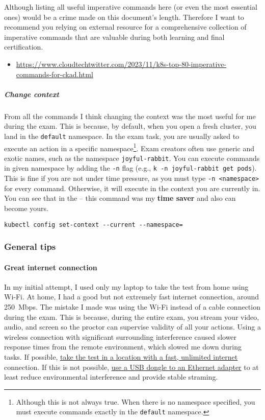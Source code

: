 Although listing all useful imperative commands here (or even the most essential ones) would be a crime made on this document's length. Therefore I want to recommend you relying on external resource for a comprehensive collection of imperative commands that are valuable during both learning and final certification.

\begin{itemize}
	\item \url{https://www.cloudtechtwitter.com/2023/11/k8s-top-80-imperative-commands-for-ckad.html}
\end{itemize}

\subparagraph{Change context}  
From all the commands I think changing the context was the most useful for me during the exam.  
This is because, by default, when you open a fresh cluster, you land in the \texttt{default} namespace.  
In the exam task, you are usually asked to execute an action in a specific namespace\footnote{Although this is not always true. When there is no namespace specified, you must execute commands exactly in the \texttt{default} namespace.}.  
Exam creators often use generic and exotic names, such as the namespace \texttt{joyful-rabbit}.  
You can execute commands in given namespace by adding the \texttt{-n} flag (e.g., \texttt{k -n joyful-rabbit get pods}).  
This is fine if you are not under time pressure, as you must type \texttt{-n <namespace>} for every command.  
Otherwise, it will execute in the context you are currently in.  
You can see that in the  -- this command was my \textbf{time saver} and also can become yours.

\begin{lstlisting}[label=lst:kubectl-change-context, caption=Change current context]
	kubectl config set-context --current --namespace=
\end{lstlisting}

\subsubsection{General tips}

\paragraph{Great internet connection} In my initial attempt, I used only my laptop to take the test from home using Wi-Fi. At home, I had a good but not extremely fast internet connection, around 250~Mbps. The mistake I made was using the Wi-Fi instead of a cable connection during the exam. This is because, during the entire exam, you stream your video, audio, and screen so the proctor can supervise validity of all your actions. Using a wireless connection with significant surrounding interference caused slower response times from the remote environment, which slowed me down during tasks. If possible, \underline{take the test in a location with a fast, unlimited internet} connection. If this is not possible, \underline{use a USB dongle to an Ethernet adapter} to at least reduce environmental interference and provide stable straming.


